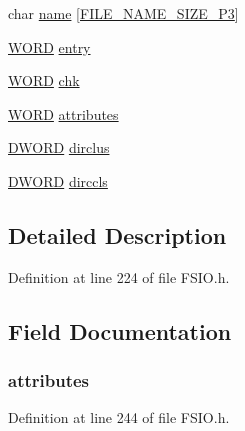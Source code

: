 \begin{DoxyCompactItemize}
\item 
char \hyperlink{struct_f_s_f_i_l_e_af7fe269d31112a5ebefb4b54f0493e90}{name} \mbox{[}\hyperlink{_f_s_i_o_8h_a8736a0b15f6c3942599baa3a0bae6b11}{F\+I\+L\+E\+\_\+\+N\+A\+M\+E\+\_\+\+S\+I\+Z\+E\+\_\+P3}\mbox{]}
\item 
\hyperlink{_generic_type_defs_8h_a2b0e863dadf920709ec53d9088ee7c91}{W\+O\+R\+D} \hyperlink{struct_f_s_f_i_l_e_a2e2abdcf887d2d03210f168f872800fc}{entry}
\item 
\hyperlink{_generic_type_defs_8h_a2b0e863dadf920709ec53d9088ee7c91}{W\+O\+R\+D} \hyperlink{struct_f_s_f_i_l_e_abc90ca7abd5ef8886a646f646281c15e}{chk}
\item 
\hyperlink{_generic_type_defs_8h_a2b0e863dadf920709ec53d9088ee7c91}{W\+O\+R\+D} \hyperlink{struct_f_s_f_i_l_e_a9388dd5b53a354556037e06412c18757}{attributes}
\item 
\hyperlink{_generic_type_defs_8h_ad342ac907eb044443153a22f964bf0af}{D\+W\+O\+R\+D} \hyperlink{struct_f_s_f_i_l_e_acb9aeba327999a325ac766eaf82ff1d8}{dirclus}
\item 
\hyperlink{_generic_type_defs_8h_ad342ac907eb044443153a22f964bf0af}{D\+W\+O\+R\+D} \hyperlink{struct_f_s_f_i_l_e_a81489721793fc9db5dbe026c661ce4fd}{dirccls}
\end{DoxyCompactItemize}


\subsection{Detailed Description}


Definition at line 224 of file F\+S\+I\+O.\+h.



\subsection{Field Documentation}
\hypertarget{struct_f_s_f_i_l_e_a9388dd5b53a354556037e06412c18757}{}
\subsubsection[{attributes}]{ attributes}\label{struct_f_s_f_i_l_e_a9388dd5b53a354556037e06412c18757}


Definition at line 244 of file F\+S\+I\+O.\+h.

\hypertarget{struct_f_s_f_i_l_e_affc734a3f8348907cd2bdc7d4413ba95}{}
